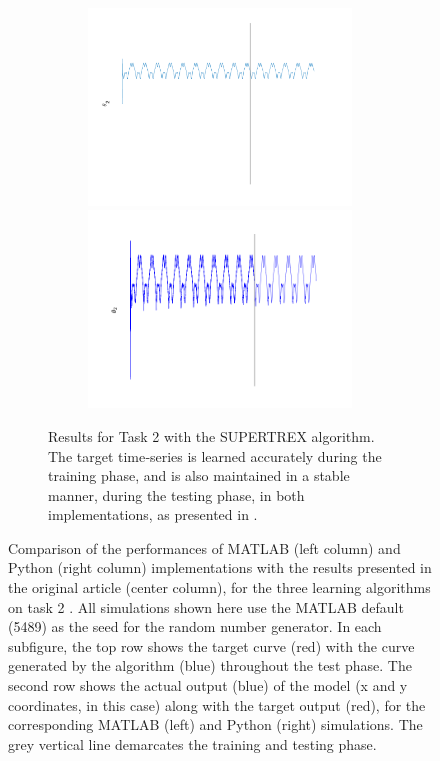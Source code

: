 \begin{figure}
\begin{subfigure}{\textwidth}
        
        \textbf{}\begin{subfigure}{\textwidth}
        \centering
        
        \includegraphics[trim=2cm 0cm 0cm 0cm, clip=true,height=0.1\linewidth,width=.45\linewidth]{Figures/MATLAB/ST_T2_Seg2_Theta2.png}
        \includegraphics[trim=2cm 0cm 0cm 0cm, clip=true,height=0.1\linewidth,width=.45\linewidth]{Figures/Python/ST_T2_Seg2_Theta2.png}
        
        \end{subfigure}
        

    \caption{Results for Task 2 with the SUPERTREX algorithm. The target time‐series is learned accurately during the training phase, and is also maintained in a stable manner, during the testing phase, in both implementations, as presented in \cite{pyle2019}.}
    \label{Fig:compTask2ST}
    
    \end{subfigure}


\caption{Comparison of the performances of MATLAB (left column) and Python (right column) implementations with the results presented in the original article (center column), for the three learning algorithms on task 2 \cite{pyle2019}. All simulations shown here use the MATLAB default (5489) as the seed for the random number generator. In each subfigure, the top row shows the target curve (red) with the curve generated by the algorithm (blue) throughout the test phase. The second row shows the actual output (blue) of the model (x and y coordinates, in this case) along with the target output (red), for the corresponding MATLAB (left) and Python (right) simulations. The grey vertical line demarcates the training and testing phase.}
\label{Fig:Comparison_Task2}

\end{figure}



